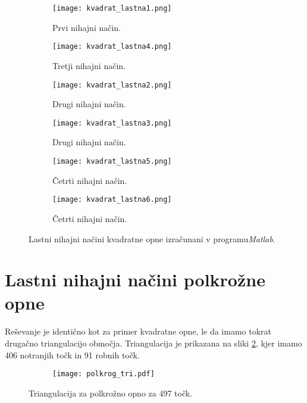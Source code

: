 \documentclass[12pt,a4paper]{article}
\begin{document}
\begin{figure}[H]
    \centering
    \begin{subfigure}[b]{0.45\textwidth}  			
        \texttt{[image: kvadrat\_lastna1.png]}
        \caption{Prvi nihajni način.}
    \end{subfigure}
    \begin{subfigure}[b]{0.45\textwidth}  			
        \texttt{[image: kvadrat\_lastna4.png]}
        \caption{Tretji nihajni način.}
    \end{subfigure}
    
    \begin{subfigure}[b]{0.45\textwidth}  			
        \texttt{[image: kvadrat\_lastna2.png]}
        \caption{Drugi nihajni način.}
    \end{subfigure}
    \begin{subfigure}[b]{0.45\textwidth}  			
        \texttt{[image: kvadrat\_lastna3.png]}
        \caption{Drugi nihajni način.}
    \end{subfigure}
    
    \begin{subfigure}[b]{0.45\textwidth}  			
        \texttt{[image: kvadrat\_lastna5.png]}
        \caption{Četrti nihajni način.}
    \end{subfigure}
    \begin{subfigure}[b]{0.45\textwidth}  			
        \texttt{[image: kvadrat\_lastna6.png]}
        \caption{Četrti nihajni način.}
    \end{subfigure}
    \caption{Lastni nihajni načini kvadratne opne izračunani v programu\textit{Matlab}.} \label{fig:slika4}
\end{figure}




\section*{Lastni nihajni načini polkrožne opne}

Reševanje je identično kot za primer kvadratne opne, le da imamo tokrat drugačno triangulacijo območja. Triangulacija je prikazana na sliki \ref{fig:slika5}, kjer imamo 406 notranjih točk in 91 robnih točk.

\begin{figure}[H]
    \centering
    \begin{subfigure}[b]{0.45\textwidth}  			
        \texttt{[image: polkrog\_tri.pdf]}
    \end{subfigure}
    \caption{Triangulacija za polkrožno opno za 497 točk.} \label{fig:slika5}
\end{figure}
\end{document}
